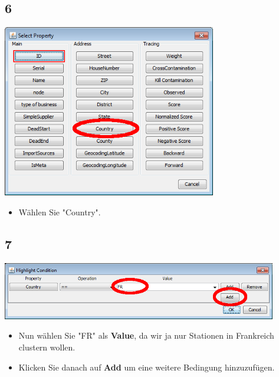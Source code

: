\documentclass{beamer}
\begin{document}
\subsection{6}
\begin{frame}
	\begin{center}
  		\includegraphics[width=0.7\textwidth]{6.png}
	\end{center}
	\begin{itemize}
		\item Wählen Sie "Country".
	\end{itemize}
\end{frame}

\subsection{7}
\begin{frame}
	\begin{center}
  		\includegraphics[width=0.9\textwidth]{7.png}
	\end{center}
	\begin{itemize}
		\item Nun wählen Sie "FR" als \textbf{Value}, da wir ja nur Stationen in Frankreich clustern wollen.
		\item Klicken Sie danach auf \textbf{Add} um eine weitere Bedingung hinzuzufügen.
	\end{itemize}
\end{frame}
\end{document}
